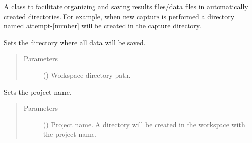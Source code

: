 \documentclass[letterpaper,10pt,english]{sphinxmanual}
\begin{document}
\begin{fulllineitems}
\label{\detokenize{reference_doc:ProjectManager}}
A class to facilitate organizing and saving results files/data files in automatically created directories. For example, when new capture is performed a directory named attempt-{[}number{]} will be created in the capture directory.

\begin{fulllineitems}
\label{\detokenize{reference_doc:ProjectManager.setWorkSpaceDir}}
Sets the directory where all data will be saved.
\begin{quote}\begin{description}
\item[{Parameters}] \leavevmode
{} () \textendash{} Workspace directory path.

\end{description}\end{quote}

\end{fulllineitems}


\begin{fulllineitems}
\label{\detokenize{reference_doc:ProjectManager.setProjName}}
Sets the project name.
\begin{quote}\begin{description}
\item[{Parameters}] \leavevmode
{} () \textendash{} Project name. A directory will be created in the workspace with the project name.

\end{description}\end{quote}

\end{fulllineitems}



\end{fulllineitems}
\end{document}
